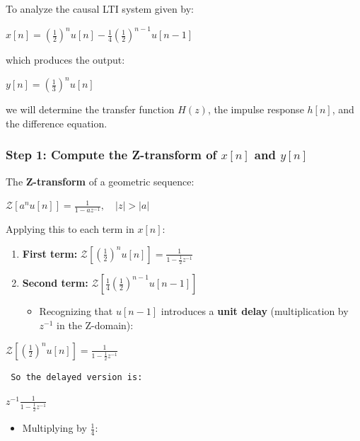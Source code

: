 \documentclass[11pt]{article}
\providecommand{\tightlist}{%
      \setlength{\itemsep}{0pt}\setlength{\parskip}{0pt}}
\begin{document}
To analyze the causal LTI system given by:

\(x[n] = \left(\frac{1}{2}\right)^n u[n] - \frac{1}{4} \left( \frac{1}{2}\right)^{n-1} u[n-1]\)

which produces the output:

\(y[n] = \left(\frac{1}{3}\right)^n u[n]\)

we will determine the transfer function \(H(z)\), the impulse response
\(h[n]\), and the difference equation.

\subsubsection{\texorpdfstring{\textbf{Step 1: Compute the Z-transform
of \(x[n]\) and
\(y[n]\)}}{Step 1: Compute the Z-transform of x{[}n{]} and y{[}n{]}}}\label{step-1-compute-the-z-transform-of-xn-and-yn}

The \textbf{Z-transform} of a geometric sequence:

\(\mathcal{Z} \left[ a^n u[n] \right] = \frac{1}{1 - a z^{-1}}, \quad |z| > |a|\)

Applying this to each term in \(x[n]\):

\begin{enumerate}
\def\labelenumi{\arabic{enumi}.}
\item
  \textbf{First term:}
  \(\mathcal{Z} \left[ \left(\frac{1}{2}\right)^n u[n] \right] = \frac{1}{1 - \frac{1}{2} z^{-1}}\)
\item
  \textbf{Second term:}
  \(\mathcal{Z} \left[ \frac{1}{4} \left( \frac{1}{2} \right)^{n-1} u[n-1] \right]\)

  \begin{itemize}
  \tightlist
  \item
    Recognizing that \(u[n-1]\) introduces a \textbf{unit delay}
    (multiplication by \(z^{-1}\) in the Z-domain):
  \end{itemize}
\end{enumerate}

\(\mathcal{Z} \left[ \left(\frac{1}{2}\right)^n u[n] \right] = \frac{1}{1 - \frac{1}{2} z^{-1}}\)

\begin{verbatim}
 So the delayed version is:
\end{verbatim}

\(z^{-1} \frac{1}{1 - \frac{1}{2} z^{-1}}\)

\begin{itemize}
\tightlist
\item
  Multiplying by \(\frac{1}{4}\):
\end{itemize}
\end{document}
